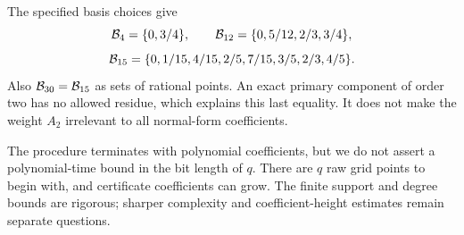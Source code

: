 \begin{example}
The specified basis choices give
\[
 \mathcal B_4=\{0,3/4\},\qquad
 \mathcal B_{12}=\{0,5/12,2/3,3/4\},
\]
\[
 \mathcal B_{15}=\{0,1/15,4/15,2/5,7/15,3/5,2/3,4/5\}.
\]
Also $\mathcal B_{30}=\mathcal B_{15}$ as sets of rational points. An exact primary
component of order two has no allowed residue, which explains this
last equality. It does not make the weight $A_2$ irrelevant to all
normal-form coefficients.
\end{example}

The procedure terminates with polynomial coefficients, but we do not
assert a polynomial-time bound in the bit length of $q$. There are
$q$ raw grid points to begin with, and certificate coefficients can
grow. The finite support and degree bounds are rigorous; sharper
complexity and coefficient-height estimates remain separate questions.
